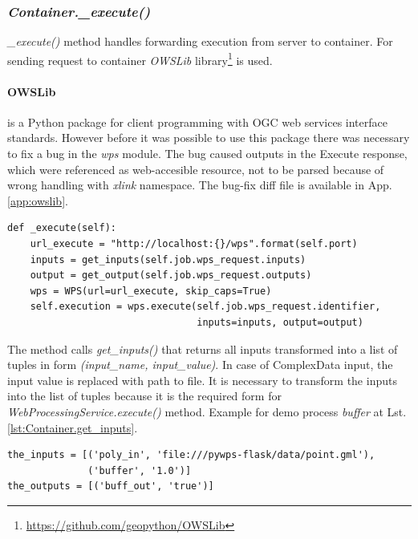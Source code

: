 \documentclass[12pt,a4paper]{article}
\begin{document}
\subsubsection{\textit{Container.\_execute()}}
\label{sub:Container_execute}
\textit{\_execute()} method handles forwarding execution from server to container. For sending request to container \textit{OWSLib} 
library\footnote{\url{https://github.com/geopython/OWSLib}} is used. 

\paragraph{OWSLib} is a Python package for client programming with OGC web services interface standards. However before it was possible
to use this package there was necessary to fix a bug in the \textit{wps} module. The bug caused outputs in the Execute response, which
were referenced as web-accesible resource, not to be parsed because of wrong handling with \textit{xlink} namespace. The bug-fix diff file 
is available in App. \ref{app:owslib}. 

\begin{lstlisting}[basicstyle=\small,caption={\textit{Container.\_execute()} method},label={lst:Container._execute}]
def _execute(self):
    url_execute = "http://localhost:{}/wps".format(self.port)
    inputs = get_inputs(self.job.wps_request.inputs)
    output = get_output(self.job.wps_request.outputs)
    wps = WPS(url=url_execute, skip_caps=True)
    self.execution = wps.execute(self.job.wps_request.identifier,
                                 inputs=inputs, output=output)
\end{lstlisting}

The method calls \textit{get\_inputs()} that 
returns all inputs transformed into a list of tuples in form \textit{(input\_name, input\_value)}. In case of ComplexData input, the input value is replaced with path to file. It is necessary to transform the inputs into the list of tuples because it is the required form for
\textit{WebProcessingService.execute()} method. Example for demo process \textit{buffer} at Lst. \ref{lst:Container.get_inputs}.

\begin{lstlisting}[basicstyle=\small,caption={\textit{get\_inputs} return value},label={lst:Container.get_inputs}]
the_inputs = [('poly_in', 'file:///pywps-flask/data/point.gml'),
              ('buffer', '1.0')]
the_outputs = [('buff_out', 'true')]
\end{lstlisting}
\end{document}

